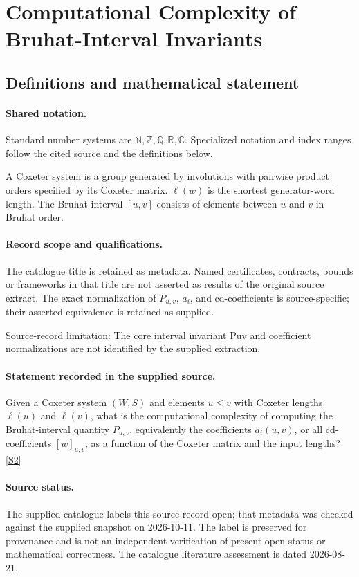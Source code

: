 \documentclass[11pt]{article}
\newcommand{\sref}[2]{\hyperlink{source:#1:#2}{[S#2]}}
\begin{document}
\section{Computational Complexity of Bruhat-Interval Invariants}\label{statement}

\subsection{Definitions and mathematical statement}

\paragraph{Shared notation.}Standard number systems are $\mathbb N,\mathbb Z,\mathbb Q,\mathbb R,\mathbb C$. Specialized notation and index ranges follow the cited source and the definitions below.


A Coxeter system is a group generated by involutions with pairwise product orders specified by its Coxeter matrix. $\ell(w)$ is the shortest generator-word length. The Bruhat interval $[u,v]$ consists of elements between $u$ and $v$ in Bruhat order.
\paragraph{Record scope and qualifications.}
The catalogue title is retained as metadata. Named certificates, contracts, bounds or frameworks in that title are not asserted as results of the original source extract.
The exact normalization of $P_{u,v}$, $a_i$, and cd-coefficients is source-specific; their asserted equivalence is retained as supplied.

Source-record limitation: The core interval invariant Puv and coefficient normalizations are not identified by the supplied extraction.
\paragraph{Statement recorded in the supplied source.}
Given a Coxeter system $(W,S)$ and elements $u\leq v$ with Coxeter lengths $\ell(u)$ and $\ell(v)$, what is the computational complexity of computing the Bruhat-interval quantity $P_{u,v}$, equivalently the coefficients $a_i(u,v)$, or all cd-coefficients $[w]_{u,v}$, as a function of the Coxeter matrix and the input lengths? \sref{statement}{2}
\paragraph{Source status.}
The supplied catalogue labels this source record open; that metadata was checked against the supplied snapshot on 2026-10-11. The label is preserved for provenance and is not an independent verification of present open status or mathematical correctness. The catalogue literature assessment is dated 2026-08-21.
\end{document}
